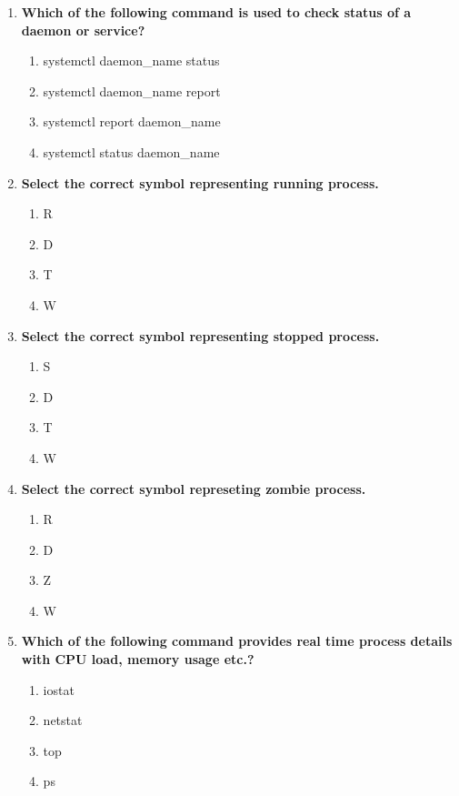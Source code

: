 \begin{flushleft}
\begin{enumerate}
		\item \textbf{Which of the following command is used to check status of a daemon or service?}
		\begin{enumerate}[label=(\alph*)]
			\item systemctl daemon\_name  status
			\item systemctl daemon\_name report
			\item systemctl report daemon\_name  
			\item systemctl status daemon\_name  %
		\end{enumerate}
		\bigskip
		\bigskip	


		\item \textbf{Select the correct symbol representing running process.}
		\begin{enumerate}[label=(\alph*)]
			\item R  %
			\item D
			\item T
			\item W
		\end{enumerate}
		\bigskip
		\bigskip	
		
		
		\item \textbf{Select the correct symbol representing stopped process.}
		\begin{enumerate}[label=(\alph*)]
			\item S  %
			\item D
			\item T
			\item W
		\end{enumerate}
		\bigskip
		\bigskip	


		\item \textbf{Select the correct symbol represeting zombie process.}
		\begin{enumerate}[label=(\alph*)]
			\item R  
			\item D
			\item Z  %
			\item W
		\end{enumerate}
		\bigskip
		\bigskip	


		\item \textbf{Which of the following command provides real time process details with CPU load, memory usage etc.?}
		\begin{enumerate}[label=(\alph*)]
			\item iostat
			\item netstat
			\item top    %
			\item ps
		\end{enumerate}
		\bigskip
		\bigskip	


\end{enumerate}
\end{flushleft}
